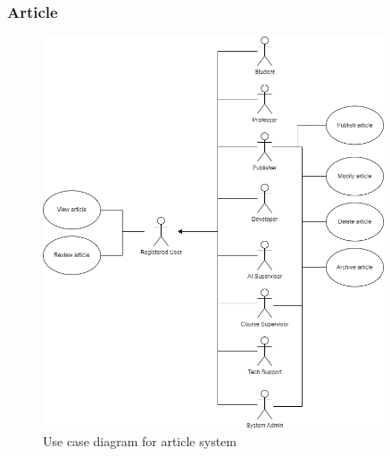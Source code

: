 \newpage
\subsubsection{Article}
\begin{figure}[h]
	\centering
	\includegraphics[width=0.9\textwidth]{images/UC-article.png}
	\caption{Use case diagram for article system}
	\label{fig:UC-article}
\end{figure}

\newpage
